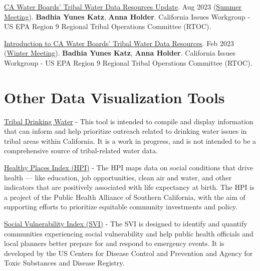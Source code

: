\documentclass[
  letterpaper,
  DIV=11,
  numbers=noendperiod]{scrreprt}
\begin{document}
\href{https://docs.google.com/presentation/d/1-K_To1xSz9-GATblLJswJyQCUD0pcI1QFzAo591XVNk/edit?usp=sharing}{CA
Water Boards' Tribal Water Data Resources Update}. Aug 2023
(\href{https://www.epa.gov/tribal-pacific-sw/region-9-rtoc-meeting-materials-summer-2023}{Summer
Meeting}). \textbf{Badhia Yunes Katz}, \textbf{Anna Holder}. California
Issues Workgroup - US EPA Region 9 Regional Tribal Operations Committee
(RTOC).

\href{https://docs.google.com/presentation/d/1Xtgz76_KohNsLFq_sAtnEgPza8lrJs9CeJX2bvSngow/edit?usp=sharing}{Introduction
to CA Water Boards' Tribal Water Data Resources}. Feb 2023
(\href{https://www.epa.gov/tribal-pacific-sw/region-9-rtoc-meeting-winter-2023}{Winter
Meeting}). \textbf{Badhia Yunes Katz}, \textbf{Anna Holder}. California
Issues Workgroup - US EPA Region 9 Regional Tribal Operations Committee
(RTOC).

\section{Other Data Visualization
Tools}\label{other-data-visualization-tools}

\href{https://cawaterdatadive.shinyapps.io/ca-tribal-data/}{Tribal
Drinking Water} - This tool is intended to compile and display
information that can inform and help prioritize outreach related to
drinking water issues in tribal areas within California. It is a work in
progress, and is not intended to be a comprehensive source of
tribal-related water data.

\href{https://map.healthyplacesindex.org/?}{Healthy Places Index (HPI)}
- The HPI maps data on social conditions that drive health --- like
education, job opportunities, clean air and water, and other indicators
that are positively associated with life expectancy at birth. The HPI is
a project of the Public Health Alliance of Southern California, with the
aim of supporting efforts to prioritize equitable community investments
and policy.

\href{https://www.atsdr.cdc.gov/placeandhealth/svi/interactive_map.html}{Social
Vulnerability Index (SVI)} - The SVI is designed to identify and
quantify communities experiencing social vulnerability and help public
health officials and local planners better prepare for and respond to
emergency events. It is developed by the US Centers for Disease Control
and Prevention and Agency for Toxic Substances and Disease Registry.

\end{document}
